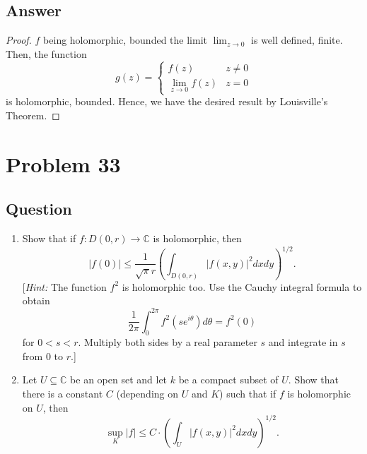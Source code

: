\documentclass[11pt]{article}
\begin{document}
\subsection{Answer}
\begin{proof}
$f$ being holomorphic, bounded the limit $\lim_{z \to 0}$ is well defined, finite. Then, the function
\[g(z) = \left\{ \begin{array}{ll} f(z) & z \neq 0 \\ \lim_{z \to 0} f(z) & z=0\end{array}\right.\]
is holomorphic, bounded. Hence, we have the desired result by Louisville's Theorem.\end{proof}

\section{Problem 33}
\subsection{Question}
\begin{enumerate}
\item Show that if $f: D(0,r) \to \mathbb{C}$ is holomorphic, then
\[|f(0)| \leq \frac{1}{\sqrt \pi r}  \left( \int_{D(0,r)} |f(x,y)|^2 dx dy\right) ^{1/2}.\]
[\emph{Hint:} The function $f^2$ is holomorphic too. Use the Cauchy integral formula to obtain 
\[\frac{1}{2 \pi} \int_0^{2 \pi} f^2 (se^{i \theta})d\theta = f^2 (0)\]
for $0<s<r$. Multiply both sides by a real parameter $s$ and integrate in $s$ from 0 to $r$.]
\item Let $U \subseteq \mathbb{C}$ be an open set and let $k$ be a compact subset of $U$. Show that there is a constant $C$ (depending on $U$ and $K$) such that if $f$ is holomorphic on $U$, then
\[\sup_K|f| \leq C \cdot \left( \int_U |f(x,y)|^2 dxdy\right)^{1/2}.\]
\end{enumerate}
\end{document}
